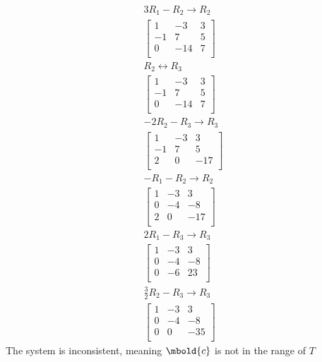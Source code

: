 \documentclass[12pt letter]{report}
\begin{document}
{{\begin{enumerate}
\begin{align*}
              3R_1 - R_2  \rightarrow R_2           \\
              \begin{bmatrix}
                1  & -3  & 3 \\
                -1 & 7   & 5 \\
                0  & -14 & 7 \\
              \end{bmatrix}
              \\
              R_2 \leftrightarrow R_3               \\
              \begin{bmatrix}
                1  & -3  & 3 \\
                -1 & 7   & 5 \\
                0  & -14 & 7 \\
              \end{bmatrix}
              \\
              -2R_2 - R_3  \rightarrow R_3          \\
              \begin{bmatrix}
                1  & -3 & 3   \\
                -1 & 7  & 5   \\
                2  & 0  & -17 \\
              \end{bmatrix}
              \\
              -R_1 - R_2  \rightarrow R_2           \\
              \begin{bmatrix}
                1 & -3 & 3   \\
                0 & -4 & -8  \\
                2 & 0  & -17 \\
              \end{bmatrix}
              \\
              2R_1 - R_3  \rightarrow R_3           \\
              \begin{bmatrix}
                1 & -3 & 3  \\
                0 & -4 & -8 \\
                0 & -6 & 23 \\
              \end{bmatrix}
              \\
              \frac{3}{2}R_2 - R_3  \rightarrow R_3 \\
              \begin{bmatrix}
                1 & -3 & 3   \\
                0 & -4 & -8  \\
                0 & 0  & -35 \\
              \end{bmatrix}
            \end{align*}
            The system is inconsistent, meaning $\mbold{c}$ is not in the range of $T$
    \end{enumerate}
  }
}
\end{document}
